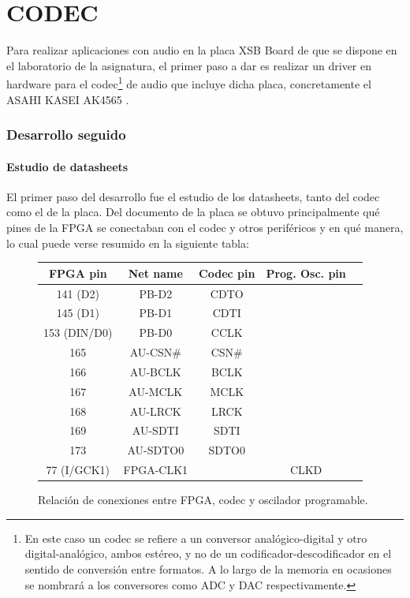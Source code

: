 \part{CODEC}

Para realizar aplicaciones con audio en la placa XSB Board \cite{XSBBoard} de que se dispone en el laboratorio de la asignatura, el primer paso a dar es realizar un driver en hardware para el codec\footnote{En este caso un codec se refiere a un conversor analógico-digital y otro digital-analógico, ambos estéreo, y no de un codificador-descodificador en el sentido de conversión entre formatos. A lo largo de la memoria en ocasiones se nombrará a los conversores como ADC y DAC respectivamente.} de audio que incluye dicha placa, concretamente el ASAHI KASEI AK4565 \cite{AK4565}.

	
	
\section{Desarrollo seguido}

	\subsection{Estudio de datasheets}
		El primer paso del desarrollo fue el estudio de los datasheets, tanto del codec como el de la placa. Del documento de la placa se obtuvo principalmente qué pines de la FPGA se conectaban con el codec y otros periféricos y en qué manera, lo cual puede verse resumido en la siguiente tabla:


\begin{figure}[H]

\centering
	\begin{tabular}{|c|c|c|c|c|}
		\hline
		\textbf{FPGA pin} & \textbf{Net name} & \textbf{Codec pin} & \textbf{Prog. Osc. pin}\\
		\hline
		141 (D2) & PB-D2 & CDTO &\\
		\hline
		145 (D1) & PB-D1 & CDTI &\\
		\hline
		153 (DIN/D0) & PB-D0 & CCLK &\\
		\hline
		165 & AU-CSN\# & CSN\# &\\
		\hline
		166 &  AU-BCLK & BCLK &\\
		\hline
		167 &  AU-MCLK & MCLK &\\
		\hline
		168 &  AU-LRCK & LRCK &\\
		\hline
		169 &  AU-SDTI & SDTI &\\
		\hline
		173 &  AU-SDTO0 & SDTO0 &\\
		\hline
		77 (I/GCK1) & FPGA-CLK1 & & CLKD\\
		\hline
	\end{tabular}

  \caption{Relación de conexiones entre FPGA, codec y oscilador programable.}
\end{figure}


